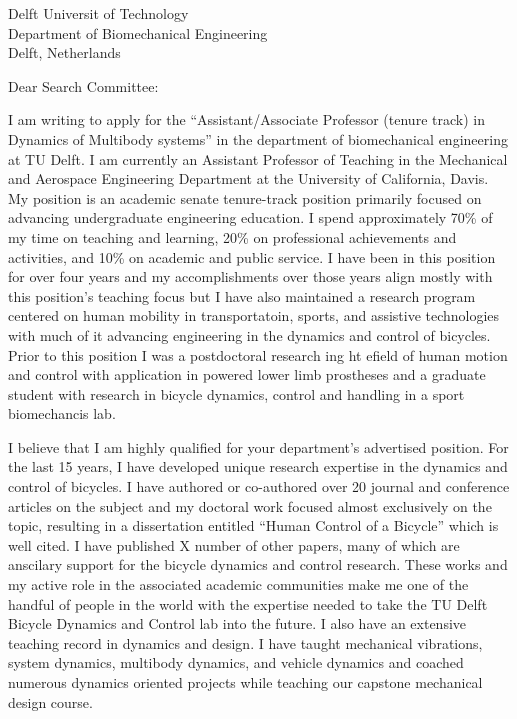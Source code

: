 \documentclass{letter}
\date{}
\begin{document}
\begin{letter}{
  Delft Universit of Technology \\
  Department of Biomechanical Engineering \\
  Delft, Netherlands
}

\opening{Dear Search Committee:}

I am writing to apply for the ``Assistant/Associate Professor (tenure track) in
Dynamics of Multibody systems'' in the department of biomechanical engineering
at TU Delft. I am currently an Assistant Professor of Teaching in the
Mechanical and Aerospace Engineering Department at the University of
California, Davis. My position is an academic senate tenure-track position
primarily focused on advancing undergraduate engineering education. I spend
approximately 70\% of my time on teaching and learning, 20\% on professional
achievements and activities, and 10\% on academic and public service. I have
been in this position for over four years and my accomplishments over those
years align mostly with this position's teaching focus but I have also
maintained a research program centered on human mobility in transportatoin,
sports, and assistive technologies with much of it advancing engineering in the
dynamics and control of bicycles. Prior to this position I was a postdoctoral
research ing ht efield of human motion and control with application in powered
lower limb prostheses and a graduate student with research in bicycle dynamics,
control and handling in a sport biomechancis lab.

I believe that I am highly qualified for your department's advertised position.
For the last 15 years, I have developed unique research expertise in the
dynamics and control of bicycles. I have authored or co-authored over 20
journal and conference articles on the subject and my doctoral work focused
almost exclusively on the topic, resulting in a dissertation entitled ``Human
Control of a Bicycle'' which is well cited. I have published X number of other
papers, many of which are anscilary support for the bicycle dynamics and
control research. These works and my active role in the associated academic
communities make me one of the handful of people in the world with the
expertise needed to take the TU Delft Bicycle Dynamics and Control lab into the
future. I also have an extensive teaching record in dynamics and design. I have
taught mechanical vibrations, system dynamics, multibody dynamics, and vehicle
dynamics and coached numerous dynamics oriented projects while teaching our
capstone mechanical design course.


\end{letter}
\end{document}
